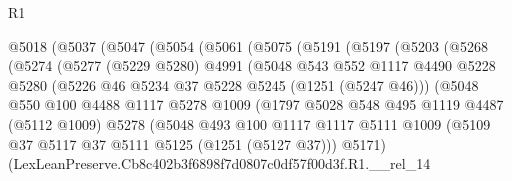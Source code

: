 \begin{lexlean}{R1}
\begin{coremodule}
                @5018
                  (@5037
                    (@5047
                      (@5054
                        (@5061
                          (@5075
                            (@5191
                              (@5197
                                (@5203
                                  (@5268
                                    (@5274
                                      (@5277
                                        (@5229 @5280)
                                        @4991
                                        (@5048
                                          @543
                                          @552
                                          @1117
                                          @4490
                                          @5228
                                          @5280
                                          (@5226 @46 @5234 @37 @5228 @5245 (@1251 (@5247 @46)))
                                          (@5048
                                            @550
                                            @100
                                            @4488
                                            @1117
                                            @5278
                                            @1009
                                            (@1797
                                              @5028
                                              @548
                                              @495
                                              @1119
                                              @4487
                                              (@5112 @1009)
                                              @5278
                                              (@5048
                                                @493
                                                @100
                                                @1117
                                                @1117
                                                @5111
                                                @1009
                                                (@5109
                                                  @37
                                                  @5117
                                                  @37
                                                  @5111
                                                  @5125
                                                  (@1251 (@5127 @37)))
                                                @5171)
                                              (LexLeanPreserve.Cb8c402b3f6898f7d0807c0df57f00d3f.R1.__rel_14

\end{coremodule}
\end{lexlean}
